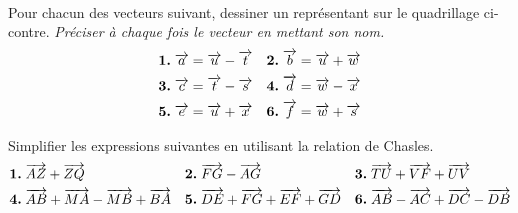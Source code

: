 \documentclass[11pt]{article}
\begin{document}
\begin{exo}~\\
  \begin{minipage}[]{.35\textwidth}
    Pour chacun des vecteurs suivant, dessiner un représentant sur le
    quadrillage ci-contre. \emph{Préciser à chaque fois le vecteur en mettant
    son nom.}
    \begin{align*}
      \textbf{1.}\;& \overrightarrow{a} = \overrightarrow{u} - \overrightarrow{t} &
      \textbf{2.}\;& \overrightarrow{b} = \overrightarrow{u} + \overrightarrow{w} \\
      \textbf{3.}\;& \overrightarrow{c} = \overrightarrow{t} - \overrightarrow{s} &
      \textbf{4.}\;& \overrightarrow{d} = \overrightarrow{w} - \overrightarrow{x} \\
      \textbf{5.}\;& \overrightarrow{e} = \overrightarrow{u} + \overrightarrow{x} &
      \textbf{6.}\;& \overrightarrow{f} = \overrightarrow{w} + \overrightarrow{s}
    \end{align*}
  \end{minipage}
  \begin{minipage}[]{.65\textwidth}
    \begin{center}
    \end{center}
  \end{minipage}
\end{exo}

\begin{exo}
  Simplifier les expressions suivantes en utilisant la relation de Chasles.
  \begin{align*}
    \textbf{1.}\;& \overrightarrow{AZ} + \overrightarrow{ZQ} &
    \textbf{2.}\;& \overrightarrow{FG} - \overrightarrow{AG} &
    \textbf{3.}\;& \overrightarrow{TU} + \overrightarrow{VF} + \overrightarrow{UV} \\
    \textbf{4.}\;& \overrightarrow{AB} + \overrightarrow{MA} - \overrightarrow{MB} + \overrightarrow{BA} &
    \textbf{5.}\;& \overrightarrow{DE} + \overrightarrow{FG} + \overrightarrow{EF} + \overrightarrow{GD} &
    \textbf{6.}\;& \overrightarrow{AB} - \overrightarrow{AC} + \overrightarrow{DC} - \overrightarrow{DB}
  \end{align*}
\end{exo}
\end{document}
